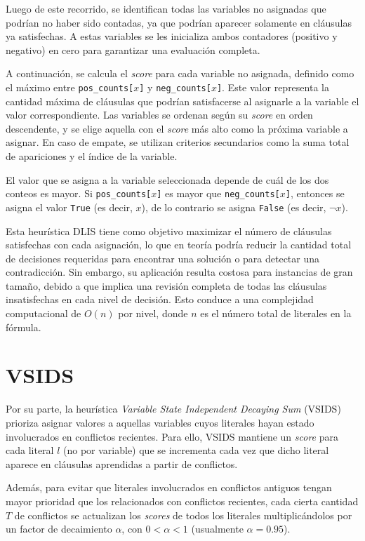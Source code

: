 Luego de este recorrido, se identifican todas las variables no asignadas que podrían no haber sido contadas, ya que podrían aparecer solamente en cláusulas ya satisfechas. A estas variables se les inicializa ambos contadores (positivo y negativo) en cero para garantizar una evaluación completa.

A continuación, se calcula el \textit{score} para cada variable no asignada, definido como el máximo entre \texttt{pos\_counts[$x$]} y \texttt{neg\_counts[$x$]}. Este valor representa la cantidad máxima de cláusulas que podrían satisfacerse al asignarle a la variable el valor correspondiente. Las variables se ordenan según su \textit{score} en orden descendente, y se elige aquella con el \textit{score} más alto como la próxima variable a asignar. En caso de empate, se utilizan criterios secundarios como la suma total de apariciones y el índice de la variable.

El valor que se asigna a la variable seleccionada depende de cuál de los dos conteos es mayor. Si \texttt{pos\_counts[$x$]} es mayor que \texttt{neg\_counts[$x$]}, entonces se asigna el valor \texttt{True} (es decir, $x$), de lo contrario se asigna \texttt{False} (es decir, $\neg x$).

Esta heurística DLIS tiene como objetivo maximizar el número de cláusulas satisfechas con cada asignación, lo que en teoría podría reducir la cantidad total de decisiones requeridas para encontrar una solución o para detectar una contradicción. Sin embargo, su aplicación resulta costosa para instancias de gran tamaño, debido a que implica una revisión completa de todas las cláusulas insatisfechas en cada nivel de decisión. Esto conduce a una complejidad computacional de $O(n)$ por nivel, donde $n$ es el número total de literales en la fórmula.

\section{VSIDS}

Por su parte, la heurística \textit{Variable State Independent Decaying Sum} (VSIDS) prioriza asignar valores a aquellas variables cuyos literales hayan estado involucrados en conflictos recientes. Para ello, VSIDS mantiene un \textit{score} para cada literal \( l \) (no por variable) que se incrementa cada vez que dicho literal aparece en cláusulas aprendidas a partir de conflictos. 

Además, para evitar que literales involucrados en conflictos antiguos tengan mayor prioridad que los relacionados con conflictos recientes, cada cierta cantidad \( T \) de conflictos se actualizan los \textit{scores} de todos los literales multiplicándolos por un factor de decaimiento \(\alpha\), con \(0 < \alpha < 1\) (usualmente \(\alpha = 0.95\)). 

